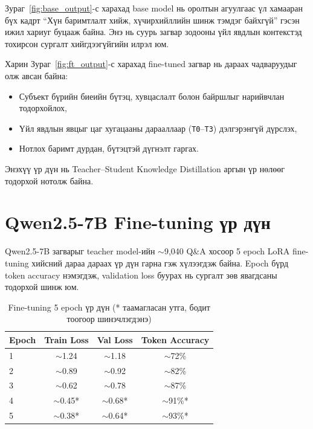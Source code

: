 Зураг~\ref{fig:base_output}-с харахад base model нь оролтын агуулгаас
үл хамааран бүх кадрт ``Хүн баримтлалт хийж, хүчирхийллийн шинж тэмдэг
байхгүй'' гэсэн ижил хариуг буцааж байна. Энэ нь суурь загвар зодооны
үйл явдлын контекстэд тохирсон сургалт хийгдээгүйгийн илрэл юм.

Харин Зураг~\ref{fig:ft_output}-с харахад fine-tuned загвар нь
дараах чадваруудыг олж авсан байна:

\begin{itemize}
    \item Субъект бүрийн биеийн бүтэц, хувцаслалт болон байршлыг нарийвчлан тодорхойлох,
    \item Үйл явдлын явцыг цаг хугацааны дарааллаар (\texttt{T0}--\texttt{T3}) дэлгэрэнгүй дүрслэх,
    \item Нотлох баримт дурдан, бүтэцтэй дүгнэлт гаргах.
\end{itemize}

Энэхүү үр дүн нь Teacher--Student Knowledge Distillation аргын
үр нөлөөг тодорхой нотолж байна.

\section{Qwen2.5-7B Fine-tuning үр дүн}

Qwen2.5-7B загварыг teacher model-ийн $\sim$9,040 Q\&A хосоор 5 epoch LoRA fine-tuning хийсний дараа дараах үр дүн гарна гэж хүлээгдэж байна. Epoch бүрд token accuracy нэмэгдэж, validation loss буурах нь сургалт зөв явагдсаны тодорхой шинж юм.

\begin{table}[h]
\centering
\caption{Fine-tuning 5 epoch үр дүн (* таамагласан утга, бодит тоогоор шинэчлэгдэнэ)}
\label{tab:finetuning_results}
\begin{tabular}{lccc}
\hline
\textbf{Epoch} & \textbf{Train Loss} & \textbf{Val Loss} & \textbf{Token Accuracy} \\
\hline
1 & $\sim$1.24  & $\sim$1.18  & $\sim$72\% \\
2 & $\sim$0.89  & $\sim$0.92  & $\sim$82\% \\
3 & $\sim$0.62  & $\sim$0.78  & $\sim$87\% \\
4 & $\sim$0.45* & $\sim$0.68* & $\sim$91\%* \\
5 & $\sim$0.38* & $\sim$0.64* & $\sim$93\%* \\
\hline
\end{tabular}
\end{table}

